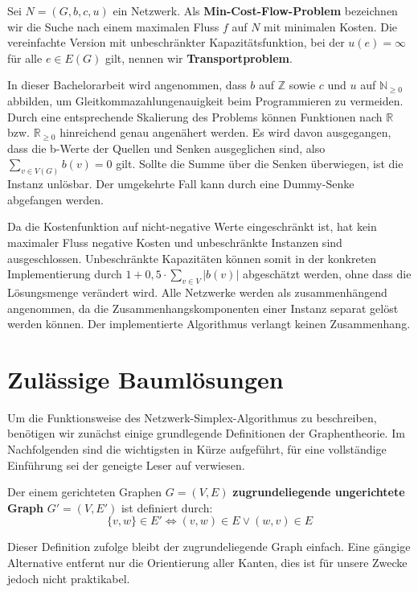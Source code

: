 \begin{defn}Sei $N=(G,b,c,u)$ ein Netzwerk. Als \textbf{Min-Cost-Flow-Problem} bezeichnen wir die Suche nach einem maximalen Fluss $f$ auf $N$ mit minimalen Kosten. Die vereinfachte Version mit unbeschränkter Kapazitätsfunktion, bei der $u(e)=\infty$ für alle $e\in E(G)$ gilt, nennen wir \textbf{Transportproblem}.\end{defn}

In dieser Bachelorarbeit wird angenommen, dass $b$ auf $\mathbb{Z}$ sowie $c$ und $u$ auf $\mathbb{N}_{\geq0}$ abbilden, um Gleitkommazahlungenauigkeit beim Programmieren zu vermeiden. Durch eine entsprechende Skalierung des Problems können Funktionen nach $\mathbb{R}$ bzw. $\mathbb{R}_{\geq 0}$ hinreichend genau angenähert werden. Es wird davon ausgegangen, dass die b-Werte der Quellen und Senken ausgeglichen sind, also $\sum_{v\in V(G)} b(v) = 0$ gilt. Sollte die Summe über die Senken überwiegen, ist die Instanz unlösbar. Der umgekehrte Fall kann durch eine Dummy-Senke\footnotemark{} abgefangen werden.


Da die Kostenfunktion auf nicht-negative Werte eingeschränkt ist, hat kein maximaler Fluss negative Kosten und unbeschränkte Instanzen sind ausgeschlossen. Unbeschränkte Kapazitäten können somit in der konkreten Implementierung durch $1+0,5\cdot\sum_{v\in V} |b(v)|$ abgeschätzt werden, ohne dass die Lösungsmenge verändert wird. Alle Netzwerke werden als zusammenhängend angenommen, da die Zusammenhangskomponenten einer Instanz separat gelöst werden können. Der implementierte Algorithmus verlangt keinen Zusammenhang.

\section{Zulässige Baumlösungen}\label{ch:BL}
Um die Funktionsweise des Netzwerk-Simplex-Algorithmus zu beschreiben, benötigen wir zunächst einige grundlegende Definitionen der Graphentheorie. Im Nachfolgenden sind die wichtigsten in Kürze aufgeführt, für eine vollständige Einführung sei der geneigte Leser auf \cite{Alma} verwiesen.

\begin{defn}Der einem gerichteten Graphen $G=(V,E)$ \textbf{zugrundeliegende ungerichtete Graph} $G'=(V,E')$ ist definiert durch:
\begin{equation*}\{v,w\}\in E' \iff (v,w) \in E \lor (w,v) \in E\end{equation*} \end{defn}
\begin{anm}Dieser Definition zufolge bleibt der zugrundeliegende Graph einfach. Eine gängige Alternative entfernt nur die Orientierung aller Kanten, dies ist für unsere Zwecke jedoch nicht praktikabel.\end{anm}

